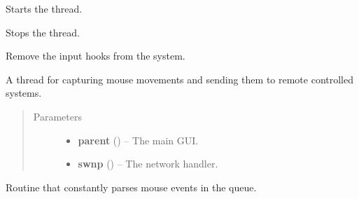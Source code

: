 \documentclass[letterpaper,10pt,english]{sphinxmanual}
\begin{document}
\begin{fulllineitems}

\begin{fulllineitems}
\label{threads:threads.inputcapture.INPUT_CAPTURE.run}
Starts the thread.

\end{fulllineitems}


\begin{fulllineitems}
\label{threads:threads.inputcapture.INPUT_CAPTURE.stop}
Stops the thread.

\end{fulllineitems}


\begin{fulllineitems}
\label{threads:threads.inputcapture.INPUT_CAPTURE.unhook}
Remove the input hooks from the system.

\end{fulllineitems}


\end{fulllineitems}


\begin{fulllineitems}
\label{threads:threads.inputcapture.MOUSE_CAPTURE}
A thread for capturing mouse movements and sending them to remote
controlled systems.
\begin{quote}\begin{description}
\item[{Parameters}] \leavevmode\begin{itemize}
\item {} 
\textbf{parent} ({\hyperref[diwacs:diwacs.GraphicalUserInterface]{}}) -- The main GUI.

\item {} 
\textbf{swnp} ({\hyperref[swnp:swnp.SWNP]{}}) -- The network handler.

\end{itemize}

\end{description}\end{quote}

\begin{fulllineitems}
\label{threads:threads.inputcapture.MOUSE_CAPTURE.parse_mouse_events}
Routine that constantly parses mouse events in the queue.

\end{fulllineitems}


\end{fulllineitems}
\end{document}
